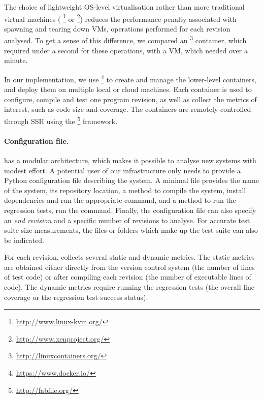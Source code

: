 The choice of lightweight OS-level virtualisation rather than more
traditional virtual machines (\eg
\kvm\footnote{\url{http://www.linux-kvm.org/}} or
\xen\footnote{\url{http://www.xenproject.org/}}) reduces the
performance penalty associated with spawning and tearing down VMs,
operations performed for each revision analysed.  To get a sense of
this difference, we compared an
\lxc\footnote{\url{http://linuxcontainers.org/}} container, which
required under a second for these operations, with a \xen VM, which
needed over a minute.

In our implementation, we use
\docker\footnote{\url{https://www.docker.io/}} to create and manage
the lower-level \lxc containers, and
deploy them on multiple local or cloud machines.
Each container is used to configure, compile and test one
program revision, as well as collect the metrics of interest, such as
code size and coverage. The containers are remotely controlled through
SSH using the \fabric\footnote{\url{http://fabfile.org/}} framework.


\paragraph{Configuration file.} \covrig has a modular architecture, which makes it
possible to analyse new systems with modest effort. A potential user
of our infrastructure only needs to provide a Python
configuration file describing the system.  A minimal file provides
the name of the system, its \git repository location, a method to
compile the system, \eg install dependencies and run the appropriate
 command, and a method to run the regression tests, \eg run
the  command.
%
Finally, the configuration file can also specify an {\em end revision}
and a specific number of revisions to analyse.  
For accurate test suite size measurements, the files or folders which
make up the test suite can also be indicated.

For each revision, \covrig collects several static and dynamic metrics.  The
static metrics are obtained either directly from the version control
system (\eg the number of lines of test code) or after compiling each
revision (\eg the number of executable lines of code).  The dynamic
metrics require running the regression tests (\eg the overall line
coverage or the regression test success status).


